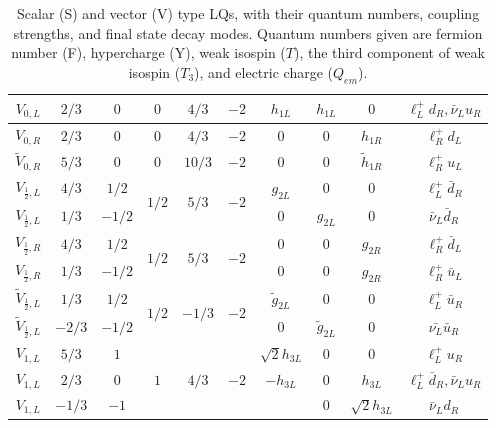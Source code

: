 \begin{table}[!Hhtbp]
\begin{tabular}{|c|ccccc|ccc|c|}
\hline
\hline
{$V_{0,L}$}  & {$2/3$}& {$0$}& {$0$} &{$4/3$}& {$-2$}& {$h_{1L}$}& {$h_{1L}$}& {$0$}&{$\ell^{+}_{L}d_{R},\bar{\nu}_{L}u_{R}$}\\
\hline
{$V_{0,R}$}  & {$2/3$}& {$0$}& {$0$} &{$4/3$}& {$-2$}& {$0$}& {$0$}& {$h_{1R}$}&{$\ell^{+}_{R}d_{L}$}\\
\hline
{$\tilde{V}_{0,R}$}  & {$5/3$}& {$0$}& {$0$} &{$10/3$}& {$-2$}& {$0$}& {$0$}& {$\tilde{h}_{1R}$}&{$\ell^{+}_{R}u_{L}$} \\
\hline
{$V_{\frac{1}{2},L}$}  & {$4/3$}& {$1/2$} & \multirow{2}{*}{$1/2$}&\multirow{2}{*}{$5/3$}& \multirow{2}{*}{$-2$}& {$g_{2L}$}& {$0$}& {$0$}&{$\ell^{+}_{L}\bar{d}_{R}$}\\
{$V_{\frac{1}{2},L}$}  & {$1/3$}& {$-1/2$} & {}&{}& {}& {$0$}& {$g_{2L}$}& {$0$}&{$\bar{\nu}_{L}\bar{d}_{R}$}\\
\hline
{$V_{\frac{1}{2},R}$}  & {$4/3$}& {$1/2$} & \multirow{2}{*}{$1/2$}&\multirow{2}{*}{$5/3$}& \multirow{2}{*}{$-2$}& {$0$}& {$0$}& {$g_{2R}$}&{$\ell^{+}_{R}\bar{d}_{L}$}\\
{$V_{\frac{1}{2},R}$}  & {$1/3$}& {$-1/2$} & {}&{}& {}& {$0$}& {$0$}& {$g_{2R}$}&{$\ell^{+}_{R}\bar{u}_{L}$}\\
\hline
{$\tilde{V}_{\frac{1}{2},L}$}  & {$1/3$}& {$1/2$} & \multirow{2}{*}{$1/2$}&\multirow{2}{*}{$-1/3$}& \multirow{2}{*}{$-2$}& {$\tilde{g}_{2L}$}& {$0$}& {$0$}&{$\ell^{+}_{L}\bar{u}_{R}$}\\
{$\tilde{V}_{\frac{1}{2},L}$}  & {$-2/3$}& {$-1/2$} & {}&{}& {}& {$0$}& {$\tilde{g}_{2L}$}& {$0$}&{$\bar{\nu_{L}}\bar{u}_{R}$}\\
\hline
{$V_{1,L}$}  &{$5/3$}& {$1$} & \multirow{3}{*}{$1$}&\multirow{3}{*}{$4/3$}& \multirow{3}{*}{$-2$}& {$\sqrt{2}h_{3L}$}& {$0$}& {$0$}&{$\ell^{+}_{L}u_{R}$}\\
{$V_{1,L}$}  &{$2/3$}& {$0$} &&&& {$-h_{3L}$}& {$0$}& {$h_{3L}$}&{$\ell^{+}_{L}\bar{d}_{R},\bar{\nu}_{L}u_{R}$}\\
{$V_{1,L}$}  &{$-1/3$}& {$-1$} &&&& {$$}& {$0$}& {$\sqrt{2}h_{3L}$}&{$\bar{\nu}_{L}d_{R}$}\\

\hline


\end{tabular}
\\
\caption[The types of scalar and vector LQs with their quantum numbers, coupling strenths, and final state decay modes]{Scalar (S) and vector (V) type LQs, with their quantum numbers, coupling strengths, and final state decay modes.  Quantum numbers given are fermion number (F), hypercharge (Y), weak isospin ($T$), the third component of weak isospin ($T_{3}$), and electric charge ($Q_{em}$).}
\label{tab:LQTable}
\end{table}


